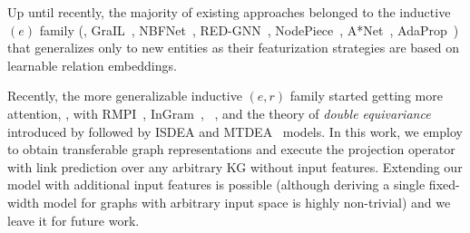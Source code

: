 Up until recently, the majority of existing approaches belonged to the inductive $(e)$ family (\eg, GraIL~\citep{grail}, NBFNet~\citep{nbfnet}, RED-GNN~\citep{redgnn}, NodePiece~\citep{nodepiece}, A*Net~\citep{astarnet}, AdaProp~\citep{adaprop}) %
that generalizes only to %
new entities as their featurization strategies are based on learnable relation embeddings. 

Recently, the more generalizable inductive $(e,r)$ family started getting more attention, \eg, with RMPI~\citep{rmpi}, InGram~\citep{ingram}, \ultra~\citep{ultra}, and the theory of \emph{double equivariance} introduced by \citet{isdea} followed by ISDEA and MTDEA~\citep{mtdea} models. 
In this work, we employ \ultra to obtain transferable graph representations and execute the projection operator with link prediction over any arbitrary KG without input features.
Extending our model with additional input features is possible (although deriving a single fixed-width model for graphs with arbitrary input space %
is highly non-trivial) and we leave it for future work.

